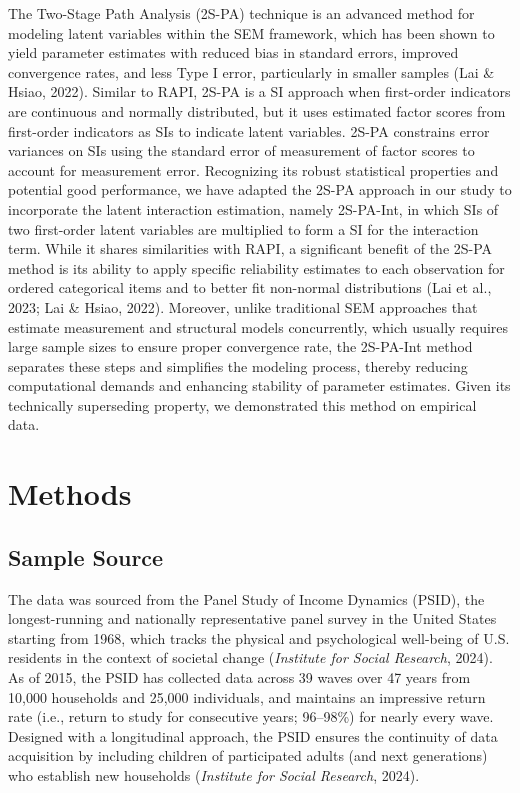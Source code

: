 \documentclass[
  man]{apa7}
\begin{document}
The Two-Stage Path Analysis (2S-PA) technique is an advanced method for modeling latent variables within the SEM framework, which has been shown to yield parameter estimates with reduced bias in standard errors, improved convergence rates, and less Type I error, particularly in smaller samples (Lai \& Hsiao, 2022). Similar to RAPI, 2S-PA is a SI approach when first-order indicators are continuous and normally distributed, but it uses estimated factor scores from first-order indicators as SIs to indicate latent variables. 2S-PA constrains error variances on SIs using the standard error of measurement of factor scores to account for measurement error. Recognizing its robust statistical properties and potential good performance, we have adapted the 2S-PA approach in our study to incorporate the latent interaction estimation, namely 2S-PA-Int, in which SIs of two first-order latent variables are multiplied to form a SI for the interaction term. While it shares similarities with RAPI, a significant benefit of the 2S-PA method is its ability to apply specific reliability estimates to each observation for ordered categorical items and to better fit non-normal distributions (Lai et al., 2023; Lai \& Hsiao, 2022). Moreover, unlike traditional SEM approaches that estimate measurement and structural models concurrently, which usually requires large sample sizes to ensure proper convergence rate, the 2S-PA-Int method separates these steps and simplifies the modeling process, thereby reducing computational demands and enhancing stability of parameter estimates. Given its technically superseding property, we demonstrated this method on empirical data.

\hypertarget{methods}{%
\section{Methods}\label{methods}}

\hypertarget{sample-source}{%
\subsection{Sample Source}\label{sample-source}}

The data was sourced from the Panel Study of Income Dynamics (PSID), the longest-running and nationally representative panel survey in the United States starting from 1968, which tracks the physical and psychological well-being of U.S. residents in the context of societal change (\emph{Institute for Social Research}, 2024). As of 2015, the PSID has collected data across 39 waves over 47 years from 10,000 households and 25,000 individuals, and maintains an impressive return rate (i.e., return to study for consecutive years; 96--98\%) for nearly every wave. Designed with a longitudinal approach, the PSID ensures the continuity of data acquisition by including children of participated adults (and next generations) who establish new households (\emph{Institute for Social Research}, 2024).
\end{document}
